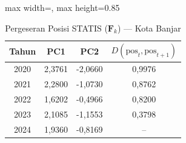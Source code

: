 \begin{table}[H]
\centering
\caption{Pergeseran Posisi STATIS ($\mathbf{F}_k$) --- Kota Banjar} \label{tab:app2jarak_statis_skor_kota_banjar}
\begin{adjustbox}{max width=\textwidth, max height=0.85\textheight}
\begin{tabular}{|c|c|c|c|}
\hline
\textbf{Tahun} & \textbf{PC1} & \textbf{PC2} & \textbf{$D(\text{pos}_t, \text{pos}_{t+1})$} \\
\hline
2020 & 2,3761 & -2,0660 & 0,9976 \\
2021 & 2,2800 & -1,0730 & 0,8762 \\
2022 & 1,6202 & -0,4966 & 0,8200 \\
2023 & 2,1085 & -1,1553 & 0,3798 \\
2024 & 1,9360 & -0,8169 & -- \\
\hline
\end{tabular}
\end{adjustbox}
\end{table}